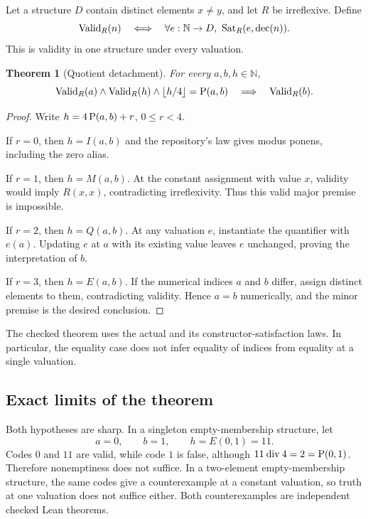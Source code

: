 \documentclass[11pt]{article}
\newtheorem{theorem}{Theorem}[section]\newtheorem{lemma}[theorem]{Lemma}\newtheorem{proposition}[theorem]{Proposition}
\newcommand{\code}[1]{\texttt{\detokenize{#1}}}
\begin{document}
Let a structure $D$ contain distinct elements $x\ne y$, and let $R$ be irreflexive. Define
\[
 \operatorname{Valid}_R(n)\quad\Longleftrightarrow\quad
 \forall e:\mathbb N\to D,\ \operatorname{Sat}_R(e,\operatorname{dec}(n)).
\]
This is validity in one structure under every valuation.

\begin{theorem}[Quotient detachment]
For every $a,b,h\in\mathbb N$,
\[
 \operatorname{Valid}_R(a)\land\operatorname{Valid}_R(h)\land
 \left\lfloor h/4\right\rfloor=\operatorname{P}(a,b)
 \quad\Longrightarrow\quad\operatorname{Valid}_R(b).
\]
\end{theorem}
\begin{proof}
Write $h=4\operatorname{P}(a,b)+r$, $0\le r<4$.

If $r=0$, then $h=I(a,b)$ and the repository's \code{sat_wim} law gives modus ponens, including the zero alias.

If $r=1$, then $h=M(a,b)$. At the constant assignment with value $x$, validity would imply $R(x,x)$, contradicting irreflexivity. Thus this valid major premise is impossible.

If $r=2$, then $h=Q(a,b)$. At any valuation $e$, instantiate the quantifier with $e(a)$. Updating $e$ at $a$ with its existing value leaves $e$ unchanged, proving the interpretation of $b$.

If $r=3$, then $h=E(a,b)$. If the numerical indices $a$ and $b$ differ, assign distinct elements to them, contradicting validity. Hence $a=b$ numerically, and the minor premise is the desired conclusion.
\end{proof}

The checked theorem uses the actual \code{Code254.dec} and its constructor-satisfaction laws. In particular, the equality case does not infer equality of indices from equality at a single valuation.

\subsection{Exact limits of the theorem}

Both hypotheses are sharp. In a singleton empty-membership structure, let
\[
 a=0,\qquad b=1,\qquad h=E(0,1)=11.
\]
Codes $0$ and $11$ are valid, while code $1$ is false, although $11\mathbin{\mathrm{div}}4=2=\operatorname{P}(0,1)$. Therefore nonemptiness does not suffice. In a two-element empty-membership structure, the same codes give a counterexample at a constant valuation, so truth at one valuation does not suffice either. Both counterexamples are independent checked Lean theorems.
\end{document}
